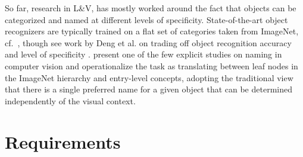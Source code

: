 \documentclass[runningheads]{llncs}
\begin{document}
So far, research in L\&V, has mostly worked around the fact that objects can be categorized and named at different levels of specificity.
 State-of-the-art object recognizers are typically trained on a flat set of categories taken from ImageNet, cf.\ \cite{googlenet}, though see work by Deng et al. on trading off object recognition accuracy and level of specificity \cite{deng2012hedging}.
\cite{Ordonez:2016} present one of the few explicit studies on naming in computer vision and operationalize the task as translating between leaf nodes in the ImageNet hierarchy and entry-level
 concepts, adopting the traditional view that there is a single preferred name for a given object that can be determined independently of the visual context.

\section{Requirements}
\label{sec:requirements}
\end{document}
